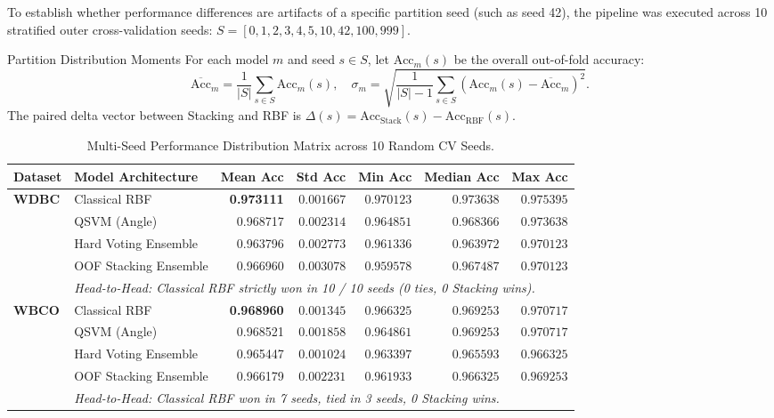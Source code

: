 \documentclass[11pt,a4paper]{article}
\begin{document}
To establish whether performance differences are artifacts of a specific partition seed (such as seed 42), the pipeline was executed across 10 stratified outer cross-validation seeds: $S = [0, 1, 2, 3, 4, 5, 10, 42, 100, 999]$.

\begin{metricbox}{Partition Distribution Moments}
For each model $m$ and seed $s \in S$, let $\text{Acc}_m(s)$ be the overall out-of-fold accuracy:
\begin{equation}
\overline{\text{Acc}}_m = \frac{1}{|S|}\sum_{s \in S} \text{Acc}_m(s), \quad \sigma_m = \sqrt{\frac{1}{|S|-1}\sum_{s \in S} (\text{Acc}_m(s) - \overline{\text{Acc}}_m)^2}.
\end{equation}
The paired delta vector between Stacking and RBF is $\Delta(s) = \text{Acc}_{\text{Stack}}(s) - \text{Acc}_{\text{RBF}}(s)$.
\end{metricbox}

\begin{table}[H]
\centering
\small
\caption{Multi-Seed Performance Distribution Matrix across 10 Random CV Seeds.}
\label{tab:seed_matrix}
\begin{tabularx}{\textwidth}{llrrrrr}
\toprule
\textbf{Dataset} & \textbf{Model Architecture} & \textbf{Mean Acc} & \textbf{Std Acc} & \textbf{Min Acc} & \textbf{Median Acc} & \textbf{Max Acc} \\
\midrule
\multirow{4}{*}{\textbf{WDBC}} 
& Classical RBF & \textbf{0.973111} & $0.001667$ & $0.970123$ & $0.973638$ & $0.975395$ \\
& QSVM (Angle) & 0.968717 & $0.002314$ & $0.964851$ & $0.968366$ & $0.973638$ \\
& Hard Voting Ensemble & 0.963796 & $0.002773$ & $0.961336$ & $0.963972$ & $0.970123$ \\
& OOF Stacking Ensemble & 0.966960 & $0.003078$ & $0.959578$ & $0.967487$ & $0.970123$ \\
\cmidrule{2-7}
& \multicolumn{6}{l}{\textit{Head-to-Head: Classical RBF strictly won in 10 / 10 seeds (0 ties, 0 Stacking wins).}} \\
\midrule
\multirow{4}{*}{\textbf{WBCO}} 
& Classical RBF & \textbf{0.968960} & $0.001345$ & $0.966325$ & $0.969253$ & $0.970717$ \\
& QSVM (Angle) & 0.968521 & $0.001858$ & $0.964861$ & $0.969253$ & $0.970717$ \\
& Hard Voting Ensemble & 0.965447 & $0.001024$ & $0.963397$ & $0.965593$ & $0.966325$ \\
& OOF Stacking Ensemble & 0.966179 & $0.002231$ & $0.961933$ & $0.966325$ & $0.969253$ \\
\cmidrule{2-7}
& \multicolumn{6}{l}{\textit{Head-to-Head: Classical RBF won in 7 seeds, tied in 3 seeds, 0 Stacking wins.}} \\
\bottomrule
\end{tabularx}
\end{table}
\end{document}
